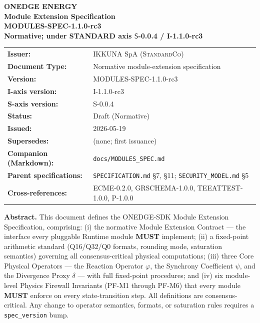 \documentclass[11pt,letterpaper]{article}
\theoremstyle{definition}
\newcommand{\StandardCo}{\textsc{StandardCo}}
\newcommand{\SDK}{\textsc{ONEDGE-SDK}}
\newcommand{\MUST}{\textbf{MUST}}
\newcommand{\ph}{\varphi}       %
\newcommand{\sy}{\psi}          %
\newcommand{\dv}{\delta}        %
\begin{document}
\begin{center}
    {\LARGE \textbf{ONEDGE ENERGY}}\\[0.20cm]
    {\Large \textbf{Module Extension Specification}}\\[0.15cm]
    {\large \textbf{MODULES-SPEC-1.1.0-rc3}}\\[0.25cm]
    {\normalsize \textbf{Normative; under STANDARD axis $\mathsf{S}$-0.0.4 / I-1.1.0-rc3}}\\[0.5cm]
\end{center}

\begin{tabular}{>{\bfseries}p{4.5cm}p{10.5cm}}
Issuer:                   & IKKUNA SpA (\StandardCo) \\
Document Type:            & Normative module-extension specification \\
Version:                  & MODULES-SPEC-1.1.0-rc3 \\
I-axis version:           & I-1.1.0-rc3 \\
S-axis version:           & S-0.0.4 \\
Status:                   & Draft (Normative) \\
Issued:                   & 2026-05-19 \\
Supersedes:               & (none; first issuance) \\
Companion (Markdown):     & \texttt{docs/MODULES\_SPEC.md} \\
Parent specifications:    & \texttt{SPECIFICATION.md} §7, §11; \texttt{SECURITY\_MODEL.md} §5 \\
Cross-references:         & ECME-0.2.0, GRSCHEMA-1.0.0, TEEATTEST-1.0.0, P-1.0.0 \\
\end{tabular}

\vspace{0.5cm}
\noindent\textbf{Abstract.}
This document defines the \SDK{} Module Extension Specification, comprising: (i) the normative Module Extension Contract — the interface every pluggable Runtime module \MUST{} implement; (ii) a fixed-point arithmetic standard (Q16/Q32/Q0 formats, rounding mode, saturation semantics) governing all consensus-critical physical computations; (iii) three Core Physical Operators — the Reaction Operator $\ph$, the Synchrony Coefficient $\sy$, and the Divergence Proxy $\dv$ — with full fixed-point procedures; and (iv) six module-level Physics Firewall Invariants (PF-M1 through PF-M6) that every module \MUST{} enforce on every state-transition step. All definitions are consensus-critical. Any change to operator semantics, formats, or saturation rules requires a \texttt{spec\_version} bump.
\end{document}
